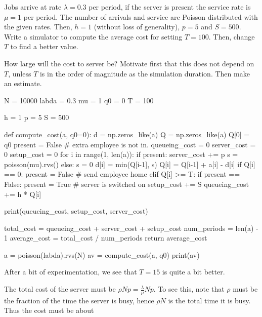 \documentclass{scrartcl}
\begin{document}
\begin{exercise}
  Jobs arrive at rate $\lambda=0.3$ per period, if the server is present the service rate is $\mu=1$ per period. The number of arrivals and service are Poisson distributed with the given rates. Then, $h=1$ (without loss of generality), $p=5$ and $S=500$. Write a simulator to compute the average cost for setting $T=100$. Then, change $T$ to find a better value.

How large will the cost to server be? Motivate first that this does not depend on $T$, unless $T$ is in the order of magnitude as the simulation duration. Then make an estimate.
  
\begin{solution}
  
\begin{pyverbatim}
N = 10000
labda = 0.3
mu = 1
q0 = 0
T = 100

h = 1
p = 5
S = 500


def compute_cost(a, q0=0):
    d = np.zeros_like(a)
    Q = np.zeros_like(a)
    Q[0] = q0
    present = False  # extra employee is not in.
    queueing_cost = 0
    server_cost = 0
    setup_cost = 0
    for i in range(1, len(a)):
        if present:
            server_cost += p
            s = poisson(mu).rvs()
        else:
            s = 0
        d[i] = min(Q[i-1], s)
        Q[i] = Q[i-1] + a[i] - d[i]
        if Q[i] == 0:
            present = False  # send employee home
        elif Q[i] >= T:
            if present == False: 
	            present = True # server is switched on
                setup_cost += S            
        queueing_cost += h * Q[i]

    print(queueing_cost, setup_cost, server_cost)

    total_cost = queueing_cost + server_cost + setup_cost
    num_periods = len(a) - 1
    average_cost = total_cost / num_periods
    return average_cost

a = poisson(labda).rvs(N)
av = compute_cost(a, q0)
print(av)
\end{pyverbatim}
After a bit of experimentation, we see that $T=15$ is quite a bit better.

The total cost of the server must be $\rho N p = \tfrac{\lambda}{\mu} N p$. To see this, note that $\rho$ must be the fraction of the time the server is busy, hence $\rho N$ is the total time it is busy. Thus the cost must be about  
\end{solution}


\end{exercise}
\end{document}
